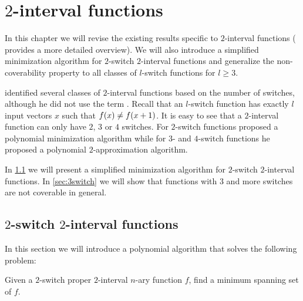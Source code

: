 \chapter{\texorpdfstring{$2$}{2}-interval functions}
\label{chap:2interval}


In this chapter we will revise the existing results specific to
$2$-interval functions
(\citet{Dubovsky2012}
provides a more detailed overview).
We will also introduce a simplified minimization algorithm
for $2$-switch $2$-interval functions
and generalize the non-coverability property to all
classes of $l$-switch functions for $l \geq 3$.

\citeauthor{Dubovsky2012} identified several classes
of $2$-interval functions \citep[p.~5]{Dubovsky2012}
based on the number of switches,
although he did not use the term .
Recall that an $l$-switch function has exactly $l$ input
vectors $x$ such that $f (x) \neq f (x+1)$.
It is easy to see that a $2$-interval function
can only have $2$, $3$ or $4$ switches.
For $2$-switch functions
\citeauthor{Dubovsky2012} proposed
a polynomial minimization algorithm
while for $3$- and $4$-switch functions
he proposed a polynomial $2$-approximation algorithm.


In \cref{sec:2int2switch}
we will present a simplified minimization algorithm
for $2$-switch $2$-interval functions.
In \cref{sec:3switch}
we will show that functions with $3$ and more switches
are not coverable in general.


\section{\texorpdfstring{$2$}{2}-switch
\texorpdfstring{$2$}{2}-interval functions}
\label{sec:2int2switch}

\newcommand{\ftwointtwoswitch}[4]
{#1^{#2}_{\interval{\rep{0}{#2}}{#3},
\interval{#4}{\rep{1}{#2}}}}

\newcommand{\fnba}{\ftwointtwoswitch{f}{n}{b_1}{a_2}}

In this section
we will introduce a polynomial algorithm
that solves the following problem:
\begin{problem}
\label{problem:2switch2intminimization}
Given a $2$-switch
proper $2$-interval $n$-ary function $f$,
find a minimum spanning set of $f$.
\end{problem}

